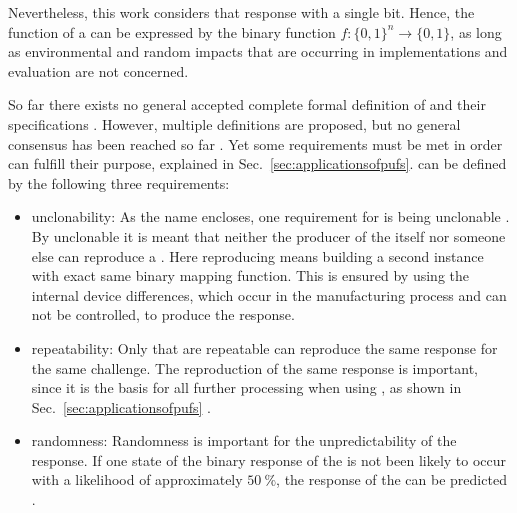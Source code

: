 Nevertheless, this work considers \pufs that response with a single bit.
Hence, the function of a \puf can be expressed by the binary function $f: \{0, 1\}^n \to \{0,1\}$, as long as environmental and random impacts that are occurring in \puf implementations and evaluation are not concerned. %

So far there exists no general accepted complete formal definition of \pufs and their specifications \cite{Becker2015ThePUFs}.
However, multiple definitions are proposed, but no general consensus has been reached so far \cite{Armknecht2011AFunctions,Ruhrmair2014PUFsGlance,Tehranipoor2012IntroductionTrust}.
Yet some requirements must be met in order \pufs can fulfill their purpose, explained in Sec.\ \ref{sec:applicationsofpufs}.
\pufs can be defined by the following three requirements:


\begin{itemize}
\item unclonability: As the name \puf encloses, one requirement for \pufs is being unclonable \cite{Tajik2014PhysicalPUFs}.
By unclonable it is meant that neither the producer of the \puf itself nor someone else can reproduce a \puf.
Here reproducing means building a second instance with exact same binary mapping function.
This is ensured by using the internal device differences, which occur in the manufacturing process and can not be controlled, to produce the \puf response.
\item repeatability: Only \pufs that are repeatable can reproduce the same response for the same challenge.
The reproduction of the same response is important, since it is the basis for all further processing when using \pufs, as shown in Sec.\ \ref{sec:applicationsofpufs} \cite{Armknecht2011AFunctions}.
\item randomness: Randomness is important for the unpredictability of the \puf response.
If one state of the binary response of the \puf is not been likely to occur with a likelihood of approximately $50\ \%$, the response of the \puf can be predicted \cite{CherifJouini2011PerformanceStatistics}.
\end{itemize}


